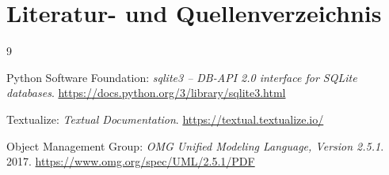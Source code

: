 \documentclass[11pt,a4paper]{article}
\begin{document}
\section*{Literatur- und Quellenverzeichnis}

\begin{thebibliography}{9}
\small

Python Software Foundation:
\textit{sqlite3 -- DB-API 2.0 interface for SQLite databases}.
\url{https://docs.python.org/3/library/sqlite3.html}

Textualize:
\textit{Textual Documentation}.
\url{https://textual.textualize.io/}

Object Management Group:
\textit{OMG Unified Modeling Language, Version 2.5.1}.
2017.
\url{https://www.omg.org/spec/UML/2.5.1/PDF}

\end{thebibliography}
\end{document}
